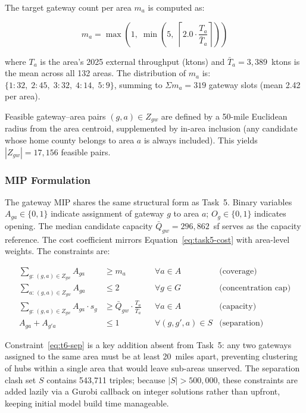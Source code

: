 The target gateway count per area $m_a$ is computed as:

\begin{equation}
  m_a = \max\!\left(1,\; \min\!\left(5,\;
    \left\lceil 2.0 \cdot \frac{T_a}{\bar{T}_a} \right\rceil
  \right)\right)
  \label{eq:task6-ma}
\end{equation}

where $T_a$ is the area's 2025 external throughput (ktons) and
$\bar{T}_a = 3{,}389$~ktons is the mean across all 132 areas. The distribution of
$m_a$ is: $\{1\!: 32,\; 2\!: 45,\; 3\!: 32,\; 4\!: 14,\; 5\!: 9\}$,
summing to $\Sigma m_a = 319$ gateway slots (mean 2.42 per area).

Feasible gateway–area pairs $(g, a) \in Z_{gw}$ are defined by a 50-mile Euclidean
radius from the area centroid, supplemented by in-area inclusion (any candidate whose
home county belongs to area $a$ is always included). This yields $|Z_{gw}| = 17{,}156$
feasible pairs.

\subsubsection{MIP Formulation}

The gateway MIP shares the same structural form as Task~5.
Binary variables $A_{ga} \in \{0,1\}$ indicate assignment of gateway $g$ to area $a$;
$O_g \in \{0,1\}$ indicates opening. The median candidate capacity
$\bar{Q}_{gw} = 296{,}862$~sf serves as the capacity reference.
The cost coefficient mirrors Equation~\eqref{eq:task5-cost} with area-level weights.
The constraints are:

\begin{align}
  \sum_{g:\,(g,a)\in Z_{gw}} A_{ga} &\geq m_a
    && \forall a \in A
    & \text{(coverage)} \\[4pt]
  \sum_{a:\,(g,a)\in Z_{gw}} A_{ga} &\leq 2
    && \forall g \in G
    & \text{(concentration cap)} \\[4pt]
  \sum_{g:\,(g,a)\in Z_{gw}} A_{ga} \cdot s_g &\geq \bar{Q}_{gw} \cdot \frac{T_a}{\bar{T}_a}
    && \forall a \in A
    & \text{(capacity)} \\[4pt]
  A_{ga} + A_{g'a} &\leq 1
    && \forall (g,g',a) \in S
    & \text{(separation)} \label{eq:t6-sep}
\end{align}

Constraint~\eqref{eq:t6-sep} is a key addition absent from Task~5: any two gateways
assigned to the same area must be at least 20~miles apart, preventing clustering of
hubs within a single area that would leave sub-areas unserved. The separation clash
set $S$ contains 543{,}711 triples; because $|S| > 500{,}000$, these constraints are
added lazily via a Gurobi callback on integer solutions rather than upfront, keeping
initial model build time manageable.

